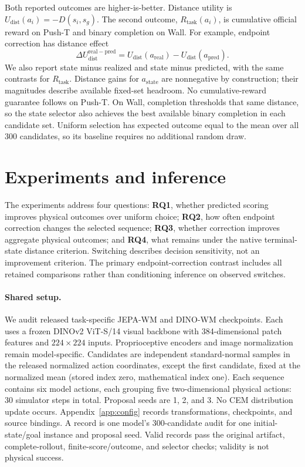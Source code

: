 \documentclass{article}
\begin{document}
Both reported outcomes are higher-is-better. Distance utility is
$U_{\mathrm{dist}}(a_i)=-D(s_i,s_g)$. The second outcome,
$R_{\mathrm{task}}(a_i)$, is cumulative official reward on Push-T and binary
completion on Wall. For example, endpoint correction has distance effect
\begin{equation}
 \Delta U_{\mathrm{dist}}^{\mathrm{real-pred}}
 =U_{\mathrm{dist}}(a_{\mathrm{real}})-U_{\mathrm{dist}}(a_{\mathrm{pred}}).
 \label{eq:effect}
\end{equation}
We also report state minus realized and state minus predicted, with the same
contrasts for $R_{\mathrm{task}}$. Distance gains for $a_{\mathrm{state}}$ are
nonnegative by construction; their magnitudes describe available fixed-set
headroom. No cumulative-reward guarantee follows on Push-T. On Wall, completion
thresholds that same distance, so the state selector also achieves the best
available binary completion in each candidate set. Uniform selection has
expected outcome equal to the mean over all 300 candidates, so its baseline
requires no additional random draw.

\section{Experiments and inference}

The experiments address four questions: \textbf{RQ1}, whether predicted scoring
improves physical outcomes over uniform choice; \textbf{RQ2}, how often endpoint
correction changes the selected sequence; \textbf{RQ3}, whether correction
improves aggregate physical outcomes; and \textbf{RQ4}, what remains under the
native terminal-state distance criterion. Switching describes decision sensitivity, not an
improvement criterion. The primary endpoint-correction contrast includes all retained
comparisons rather than conditioning inference on observed switches.

\paragraph{Shared setup.}
We audit released task-specific JEPA-WM and DINO-WM checkpoints. Each uses a
frozen DINOv2 ViT-S/14 visual backbone with 384-dimensional patch features and
$224\times224$ inputs. Proprioceptive encoders and image normalization remain
model-specific. Candidates are independent standard-normal samples in the
released normalized action coordinates, except the first candidate, fixed at the
normalized mean (stored index zero, mathematical index one). Each sequence
contains six model actions, each grouping five
two-dimensional physical actions: 30 simulator steps in total. Proposal seeds
are 1, 2, and 3. No CEM distribution update occurs. Appendix~\ref{app:config}
records transformations, checkpoints, and source bindings.
A record is one model's 300-candidate audit for one initial-state/goal instance
and proposal seed. Valid records pass the original artifact, complete-rollout,
finite-score/outcome, and selector checks; validity is not physical success.
\end{document}
